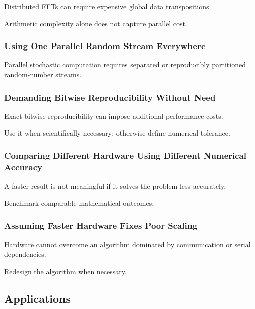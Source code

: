Distributed FFTs can require expensive global data transpositions.

Arithmetic complexity alone does not capture parallel cost.

\subsubsection{Using One Parallel Random Stream Everywhere}

Parallel stochastic computation requires separated or reproducibly
partitioned random-number streams.

\subsubsection{Demanding Bitwise Reproducibility Without Need}

Exact bitwise reproducibility can impose additional performance costs.

Use it when scientifically necessary; otherwise define numerical tolerance.

\subsubsection{Comparing Different Hardware Using Different Numerical Accuracy}

A faster result is not meaningful if it solves the problem less accurately.

Benchmark comparable mathematical outcomes.

\subsubsection{Assuming Faster Hardware Fixes Poor Scaling}

Hardware cannot overcome an algorithm dominated by communication or serial
dependencies.

Redesign the algorithm when necessary.

\subsection{Applications}
\label{subsec:hpmc-applications}

